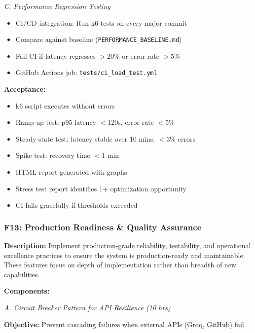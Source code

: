 \documentclass[11pt,a4paper]{article}
\begin{document}
\textit{C. Performance Regression Testing}
\begin{itemize}[leftmargin=*]
    \item CI/CD integration: Run k6 tests on every major commit
    \item Compare against baseline (\texttt{PERFORMANCE\_BASELINE.md})
    \item Fail CI if latency regresses $>$20\% or error rate $>$5\%
    \item GitHub Actions job: \texttt{tests/ci\_load\_test.yml}
\end{itemize}

\textbf{Acceptance:}
\begin{itemize}[leftmargin=*]
    \item[$\checkmark$] k6 script executes without errors
    \item[$\checkmark$] Ramp-up test: p95 latency $<$120s, error rate $<$5\%
    \item[$\checkmark$] Steady state test: latency stable over 10 mins, $<$3\% errors
    \item[$\checkmark$] Spike test: recovery time $<$1 min
    \item[$\checkmark$] HTML report generated with graphs
    \item[$\checkmark$] Stress test report identifies 1+ optimization opportunity
    \item[$\checkmark$] CI fails gracefully if thresholds exceeded
\end{itemize}

\subsubsection{F13: Production Readiness \& Quality Assurance}
\textbf{Description:} Implement production-grade reliability, testability, and operational excellence practices to ensure the system is production-ready and maintainable. These features focus on depth of implementation rather than breadth of new capabilities.

\textbf{Components:}

\textit{A. Circuit Breaker Pattern for API Resilience (10 hrs)}

\textbf{Objective:} Prevent cascading failures when external APIs (Groq, GitHub) fail.
\end{document}

